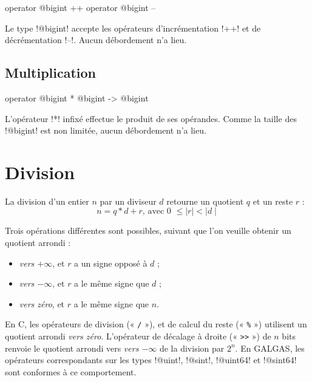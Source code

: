 \begin{galgasbox}
operator @bigint ++
operator @bigint --
\end{galgasbox}

Le type \ggs!@bigint! accepte les opérateurs d'incrémentation \ggs!++! et de décrémentation \ggs!--!. Aucun débordement n'a lieu.

\subsection{Multiplication}

\begin{galgasbox}
operator @bigint * @bigint -> @bigint
\end{galgasbox}

L'opérateur \ggs!*! infixé effectue le produit de ses opérandes. Comme la taille des \ggs!@bigint! est non limitée, aucun débordement n'a lieu.




\section{Division}



La division d'un entier $n$ par un diviseur $d$ retourne un quotient $q$ et un reste $r$ :
\begin{equation*}
n = q * d + r\text{, avec 0 } \leqslant \mid r\mid < \mid d\mid
\end{equation*}

Trois opérations différentes sont possibles, suivant que l'on veuille obtenir un quotient arrondi :
\begin{itemize}
\item \emph{vers $+\infty$}, et $r$ a un signe opposé à $d$ ;
\item \emph{vers $-\infty$}, et $r$ a le même signe que $d$ ;
\item \emph{vers zéro}, et $r$ a le même signe que $n$.
\end{itemize}

En C, les opérateurs de division (« \texttt{/} »), et de calcul du reste (« \texttt{\%} ») utilisent un quotient arrondi \emph{vers zéro}. L'opérateur de décalage à droite (« \texttt{>{}>} ») de $n$ bits renvoie le quotient arrondi vers \emph{vers $-\infty$} de la division par $2^n$. En GALGAS, les opérateurs correspondants sur les types \ggs!@uint!, \ggs!@sint!, \ggs!@uint64! et \ggs!@sint64! sont conformes à ce comportement.

